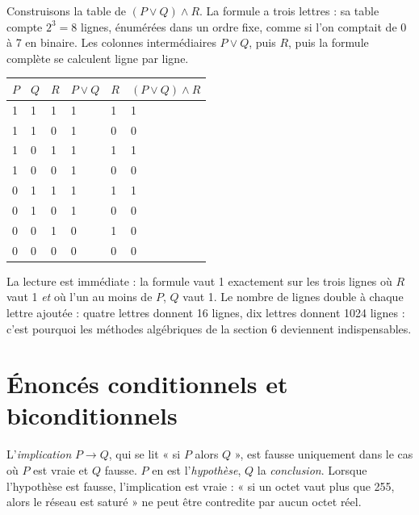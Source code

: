 \begin{exemple}
Construisons la table de $(P \lor Q) \land R$. La formule a trois lettres : sa table compte $2^{3} = 8$ lignes, énumérées dans un ordre fixe, comme si l'on comptait de 0 à 7 en binaire. Les colonnes intermédiaires $P \lor Q$, puis $R$, puis la formule complète se calculent ligne par ligne.

\begin{center}
\begin{tabular}{C{0.7cm}C{0.7cm}C{0.7cm}C{1.4cm}C{1.2cm}C{2.2cm}}
\toprule
{}$P$ & $Q$ & $R$ & $P \lor Q$ & $R$ & $(P \lor Q) \land R$\\
 & 1 & 1 & 1 & 1 & 1\\
1 & 1 & 0 & 1 & 0 & 0\\
1 & 0 & 1 & 1 & 1 & 1\\
1 & 0 & 0 & 1 & 0 & 0\\
0 & 1 & 1 & 1 & 1 & 1\\
0 & 1 & 0 & 1 & 0 & 0\\
0 & 0 & 1 & 0 & 1 & 0\\
0 & 0 & 0 & 0 & 0 & 0\\
\bottomrule
\end{tabular}
\label{ch2:tab:troislettres}
\end{center}

La lecture est immédiate : la formule vaut 1 exactement sur les trois lignes où $R$ vaut 1 \emph{et} où l'un au moins de $P$, $Q$ vaut 1. Le nombre de lignes double à chaque lettre ajoutée : quatre lettres donnent 16 lignes, dix lettres donnent 1024 lignes : c'est pourquoi les méthodes algébriques de la section 6 deviennent indispensables.
\end{exemple}

\section{Énoncés conditionnels et biconditionnels}

\begin{definition}[implication]
L'\emph{implication} $P \rightarrow Q$, qui se lit « si $P$ alors $Q$ », est fausse uniquement dans le cas où $P$ est vraie et $Q$ fausse. $P$ en est l'\emph{hypothèse}, $Q$ la \emph{conclusion}. Lorsque l'hypothèse est fausse, l'implication est vraie : « si un octet vaut plus que 255, alors le réseau est saturé » ne peut être contredite par aucun octet réel.
\end{definition}

